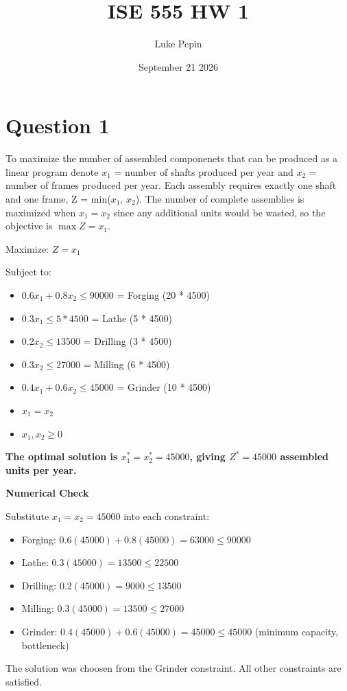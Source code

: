 \documentclass{article}
\title{ISE 555 HW 1}
\author{Luke Pepin}
\date{September 21 2026}
\begin{document}
\maketitle

\section*{Question 1}
To maximize the number of assembled componenets that can be produced as a linear program denote $x_1$ = number of shafts produced per year and $x_2$ = number of frames produced per year. Each assembly requires exactly one shaft and one frame, Z = min($x_1$, $x_2$). The number of complete assemblies is maximized when $x_1 = x_2$ since any additional units would be wasted, so the objective is $\max Z = x_1$.

Maximize: $Z = x_1$

Subject to:
\begin{itemize}
    \item $0.6x_1 + 0.8x_2 \le 90000$ = Forging (20 * 4500)
    \item $0.3x_1 \le 5 * 4500$ = Lathe (5 * 4500)
    \item $0.2x_2 \le 13500$ = Drilling (3 * 4500)
    \item $0.3x_2 \le 27000$ = Milling (6 * 4500)
    \item $0.4x_1 + 0.6x_2 \le 45000$ = Grinder (10 * 4500)
    \item $x_1 = x_2$
    \item $x_1, x_2 \ge 0$
\end{itemize}

    \textbf{The optimal solution is $x_1^* = x_2^* = 45000$, giving $Z^* = 45000$ assembled units per year.}

    \textbf{Numerical Check}

    Substitute $x_1 = x_2 = 45000$ into each constraint:
    \begin{itemize}
        \item Forging: $0.6(45000) + 0.8(45000) = 63000 \le 90000$
        \item Lathe: $0.3(45000) = 13500 \le 22500$
        \item Drilling: $0.2(45000) = 9000 \le 13500$
        \item Milling: $0.3(45000) = 13500 \le 27000$
        \item Grinder: $0.4(45000) + 0.6(45000) = 45000 \le 45000$ (minimum capacity, bottleneck)
    \end{itemize}
    The solution was choosen from the Grinder constraint. All other constraints are satisfied.
\end{document}
